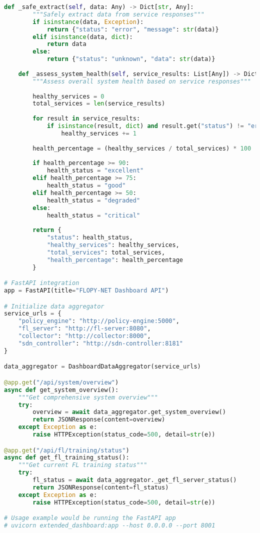 \begin{lstlisting}[language=python, caption=Dashboard Backend Extension]
    def _safe_extract(self, data: Any) -> Dict[str, Any]:
        """Safely extract data from service responses"""
        if isinstance(data, Exception):
            return {"status": "error", "message": str(data)}
        elif isinstance(data, dict):
            return data
        else:
            return {"status": "unknown", "data": str(data)}
    
    def _assess_system_health(self, service_results: List[Any]) -> Dict[str, Any]:
        """Assess overall system health based on service responses"""
        
        healthy_services = 0
        total_services = len(service_results)
        
        for result in service_results:
            if isinstance(result, dict) and result.get("status") != "error":
                healthy_services += 1
        
        health_percentage = (healthy_services / total_services) * 100
        
        if health_percentage >= 90:
            health_status = "excellent"
        elif health_percentage >= 75:
            health_status = "good"
        elif health_percentage >= 50:
            health_status = "degraded"
        else:
            health_status = "critical"
        
        return {
            "status": health_status,
            "healthy_services": healthy_services,
            "total_services": total_services,
            "health_percentage": health_percentage
        }

# FastAPI integration
app = FastAPI(title="FLOPY-NET Dashboard API")

# Initialize data aggregator
service_urls = {
    "policy_engine": "http://policy-engine:5000",
    "fl_server": "http://fl-server:8080",
    "collector": "http://collector:8000",
    "sdn_controller": "http://sdn-controller:8181"
}

data_aggregator = DashboardDataAggregator(service_urls)

@app.get("/api/system/overview")
async def get_system_overview():
    """Get comprehensive system overview"""
    try:
        overview = await data_aggregator.get_system_overview()
        return JSONResponse(content=overview)
    except Exception as e:
        raise HTTPException(status_code=500, detail=str(e))

@app.get("/api/fl/training/status")
async def get_fl_training_status():
    """Get current FL training status"""
    try:
        fl_status = await data_aggregator._get_fl_server_status()
        return JSONResponse(content=fl_status)
    except Exception as e:
        raise HTTPException(status_code=500, detail=str(e))

# Usage example would be running the FastAPI app
# uvicorn extended_dashboard:app --host 0.0.0.0 --port 8001
\end{lstlisting}

